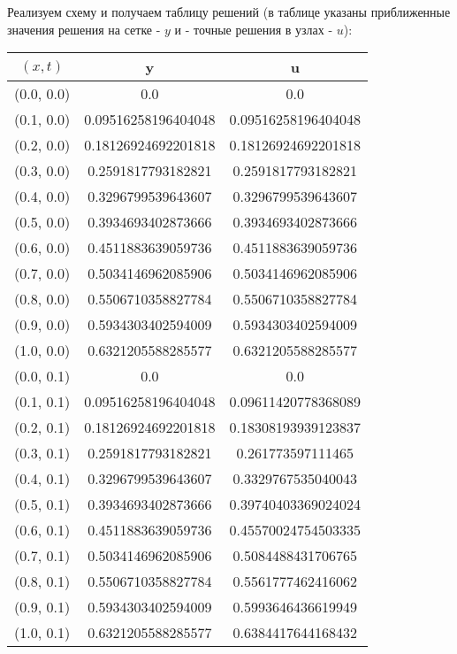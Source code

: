 Реализуем схему и получаем таблицу решений (в таблице указаны приближенные значения решения на сетке - $y$ и - точные решения в узлах - $u$):
\tiny
\begin{table}[H]
\begin{tabular}{|c|c|c|}
\hline
$(x,t)$ &  y & u \\
\hline
(0.0, 0.0) & 0.0 & 0.0 \\
\hline
(0.1, 0.0) & 0.09516258196404048 & 0.09516258196404048 \\
\hline
(0.2, 0.0) & 0.18126924692201818 & 0.18126924692201818 \\
\hline
(0.3, 0.0) & 0.2591817793182821 & 0.2591817793182821 \\
\hline
(0.4, 0.0) & 0.3296799539643607 & 0.3296799539643607 \\
\hline
(0.5, 0.0) & 0.3934693402873666 & 0.3934693402873666 \\
\hline
(0.6, 0.0) & 0.4511883639059736 & 0.4511883639059736 \\
\hline
(0.7, 0.0) & 0.5034146962085906 & 0.5034146962085906 \\
\hline
(0.8, 0.0) & 0.5506710358827784 & 0.5506710358827784 \\
\hline
(0.9, 0.0) & 0.5934303402594009 & 0.5934303402594009 \\
\hline
(1.0, 0.0) & 0.6321205588285577 & 0.6321205588285577 \\
\hline
\hline
(0.0, 0.1) & 0.0 & 0.0 \\
\hline
(0.1, 0.1) & 0.09516258196404048 & 0.09611420778368089 \\
\hline
(0.2, 0.1) & 0.18126924692201818 & 0.18308193939123837 \\
\hline
(0.3, 0.1) & 0.2591817793182821 & 0.261773597111465 \\
\hline
(0.4, 0.1) & 0.3296799539643607 & 0.3329767535040043 \\
\hline
(0.5, 0.1) & 0.3934693402873666 & 0.39740403369024024 \\
\hline
(0.6, 0.1) & 0.4511883639059736 & 0.45570024754503335 \\
\hline
(0.7, 0.1) & 0.5034146962085906 & 0.5084488431706765 \\
\hline
(0.8, 0.1) & 0.5506710358827784 & 0.5561777462416062 \\
\hline
(0.9, 0.1) & 0.5934303402594009 & 0.5993646436619949 \\
\hline
(1.0, 0.1) & 0.6321205588285577 & 0.6384417644168432 \\
\hline
\end{tabular}
\end{table}
